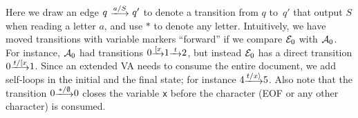 \begin{example}
\begin{center}
\end{center}
Here we draw an edge $q \ \longtrans{a / S} \ q'$ to denote a transition from
$q$ to~$q'$ that output $S$ when reading a letter $a$, and use $*$ to denote any
letter. Intuitively, we have moved transitions with variable markers ``forward''
if we compare $\mathcal{E}_0$ with $\mathcal{A}_0$.  For instance, $\mathcal{A}_0$ had transitions $0
\trans{\Open{x}} 1 \trans{t} 2$, but instead $\mathcal{E}_0$ has a  direct transition $0
\longtrans{t/\Open{x}} 1$.  Since an extended VA needs to consume the entire
document, we add self-loops in the initial and the final state; for instance $4
\longtrans{t/\Close{x}} 5$. Also note that the transition $0
\longtrans{*/\emptyset} 0$ closes the variable \texttt{x} before the character
(\textsf{EOF} or any other character) is consumed.
\end{example}

